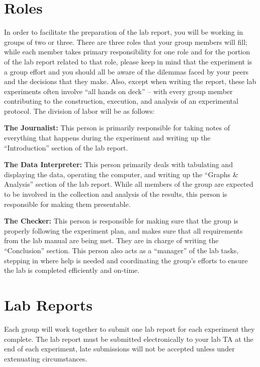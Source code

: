 \section*{Roles}
In order to facilitate the preparation of the lab report, you will be working in groups of two or three.  There are three roles that your group members will fill; while each member takes primary responsibility for one role and for the portion of the lab report related to that role, please keep in mind that the experiment is a group effort and you should all be aware of the dilemmas faced by your peers and the decisions that they make.  Also, except when writing the report, these lab experiments often involve ``all hands on deck'' -- with every group member contributing to the construction, execution, and analysis of an experimental protocol.  The division of labor will be as follows:
\begin{list}{}{\itemsep=1pt} %
\item \textbf{The Journalist:} This person is primarily responsible for taking notes of everything that happens during the experiment and writing up the ``Introduction'' section of the lab report.
 
\item \textbf{The Data Interpreter:} This person primarily deals with tabulating and displaying the data, operating the computer, and writing up the ``Graphs \& Analysis'' section of the lab report. While all members of the group are expected to be involved in the collection and analysis of the results, this person is responsible for making them presentable.
 
\item \textbf{The Checker:} This person is responsible for making sure that the group is properly following the experiment plan, and makes sure that all requirements from the lab manual are being met. They are in charge of writing the ``Conclusion'' section. This person also acts as a ``manager'' of the lab tasks, stepping in where help is needed and coordinating the group's efforts to ensure the lab is completed efficiently and on-time.
\end{list}

\newpage

\section*{Lab Reports}
Each group will work together to submit one lab report for each experiment they complete.
The lab report must be submitted electronically to your lab TA at the end of each experiment, late submissions will not be accepted unless under extenuating circumstances.

